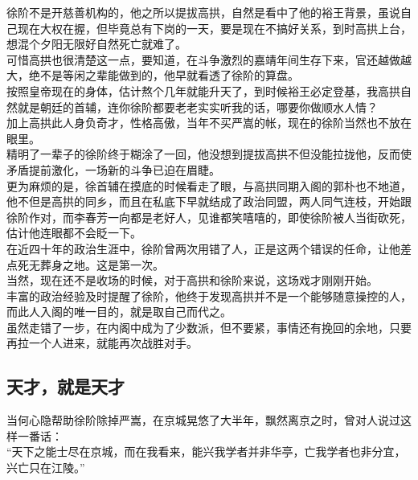 \begin{multicols}{\theparacolNo}
徐阶不是开慈善机构的，他之所以提拔高拱，自然是看中了他的裕王背景，虽说自己现在大权在握，但毕竟总有下岗的一天，要是现在不搞好关系，到时高拱上台，想混个夕阳无限好自然死亡就难了。\\

可惜高拱也很清楚这一点，要知道，在斗争激烈的嘉靖年间生存下来，官还越做越大，绝不是等闲之辈能做到的，他早就看透了徐阶的算盘。\\

按照皇帝现在的身体，估计熬个几年就能升天了，到时候裕王必定登基，我高拱自然就是朝廷的首辅，连你徐阶都要老老实实听我的话，哪要你做顺水人情？\\

加上高拱此人身负奇才，性格高傲，当年不买严嵩的帐，现在的徐阶当然也不放在眼里。\\

精明了一辈子的徐阶终于糊涂了一回，他没想到提拔高拱不但没能拉拢他，反而使矛盾提前激化，一场新的斗争已迫在眉睫。\\

更为麻烦的是，徐首辅在摸底的时候看走了眼，与高拱同期入阁的郭朴也不地道，他不但是高拱的同乡，而且在私底下早就结成了政治同盟，两人同气连枝，开始跟徐阶作对，而李春芳一向都是老好人，见谁都笑嘻嘻的，即使徐阶被人当街砍死，估计他连眼都不会眨一下。\\

在近四十年的政治生涯中，徐阶曾两次用错了人，正是这两个错误的任命，让他差点死无葬身之地。这是第一次。\\

当然，现在还不是收场的时候，对于高拱和徐阶来说，这场戏才刚刚开始。\\

丰富的政治经验及时提醒了徐阶，他终于发现高拱并不是一个能够随意操控的人，而此人入阁的唯一目的，就是取自己而代之。\\

虽然走错了一步，在内阁中成为了少数派，但不要紧，事情还有挽回的余地，只要再拉一个人进来，就能再次战胜对手。\\

\subsection{天才，就是天才}
当何心隐帮助徐阶除掉严嵩，在京城晃悠了大半年，飘然离京之时，曾对人说过这样一番话：\\

“天下之能士尽在京城，而在我看来，能兴我学者并非华亭，亡我学者也非分宜，兴亡只在江陵。”\\


\end{multicols}
